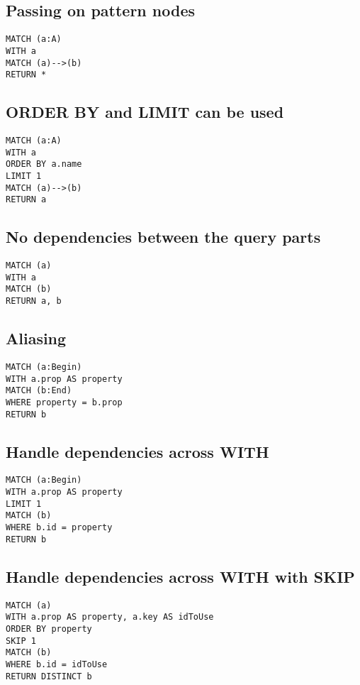 \subsection{Passing on pattern nodes}

\begin{lstlisting}
MATCH (a:A)
WITH a
MATCH (a)-->(b)
RETURN *
\end{lstlisting}

\subsection{ORDER BY and LIMIT can be used}

\begin{lstlisting}
MATCH (a:A)
WITH a
ORDER BY a.name
LIMIT 1
MATCH (a)-->(b)
RETURN a
\end{lstlisting}

\subsection{No dependencies between the query parts}

\begin{lstlisting}
MATCH (a)
WITH a
MATCH (b)
RETURN a, b
\end{lstlisting}

\subsection{Aliasing}

\begin{lstlisting}
MATCH (a:Begin)
WITH a.prop AS property
MATCH (b:End)
WHERE property = b.prop
RETURN b
\end{lstlisting}

\subsection{Handle dependencies across WITH}

\begin{lstlisting}
MATCH (a:Begin)
WITH a.prop AS property
LIMIT 1
MATCH (b)
WHERE b.id = property
RETURN b
\end{lstlisting}

\subsection{Handle dependencies across WITH with SKIP}

\begin{lstlisting}
MATCH (a)
WITH a.prop AS property, a.key AS idToUse
ORDER BY property
SKIP 1
MATCH (b)
WHERE b.id = idToUse
RETURN DISTINCT b
\end{lstlisting}

